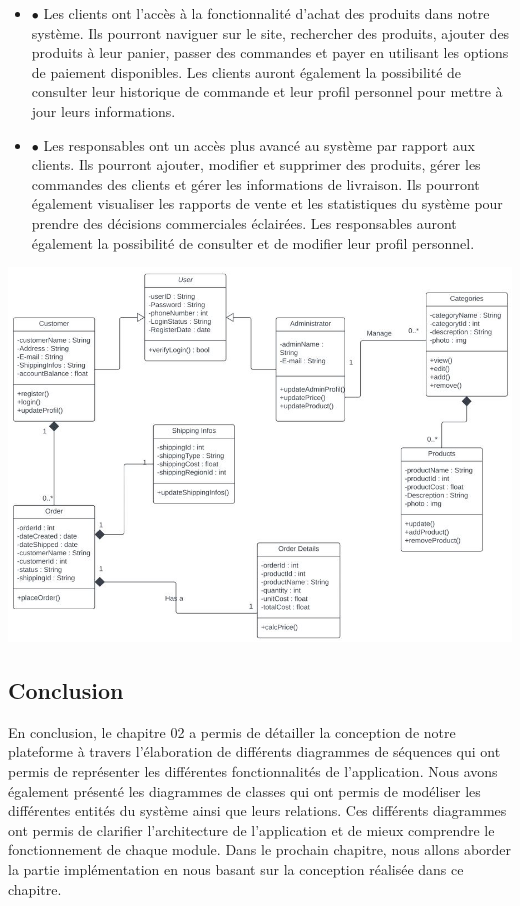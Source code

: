 \documentclass[a4paper,12pt,oneside]{article}
\begin{document}
{\begin{itemize}
        \item[]
         $\bullet$ Les clients ont l'accès à la fonctionnalité d'achat des produits dans notre système. Ils pourront naviguer sur le site, rechercher des produits, ajouter des produits à leur panier, passer des commandes et payer en utilisant les options de paiement disponibles. Les clients auront également la possibilité de consulter leur historique de commande et leur profil personnel pour mettre à jour leurs informations.
    		\item[]
         $\bullet$  Les responsables ont un accès plus avancé au système par rapport aux clients. Ils pourront ajouter, modifier et supprimer des produits, gérer les commandes des clients et gérer les informations de livraison. Ils pourront également visualiser les rapports de vente et les statistiques du système pour prendre des décisions commerciales éclairées. Les responsables auront également la possibilité de consulter et de modifier leur profil personnel.
                
    		\end{itemize}
\newpage
		\begin{center}
  		\includegraphics[width=1\textwidth]{Class diagramm}
		\end{center}


\subsection{Conclusion}

\hspace{1cm} En conclusion, le chapitre 02 a permis de détailler la conception de notre plateforme à travers l'élaboration de différents diagrammes de séquences qui ont permis de représenter les différentes fonctionnalités de l'application. Nous avons également présenté les diagrammes de classes qui ont permis de modéliser les différentes entités du système ainsi que leurs relations. Ces différents diagrammes ont permis de clarifier l'architecture de l'application et de mieux comprendre le fonctionnement de chaque module. Dans le prochain chapitre, nous allons aborder la partie implémentation en nous basant sur la conception réalisée dans ce chapitre.

}
\end{document}
